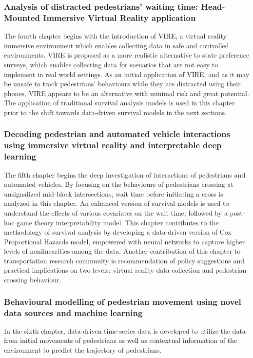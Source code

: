 \subsubsection*{Analysis of distracted pedestrians' waiting time: Head-Mounted Immersive Virtual Reality application}
The fourth chapter begins with the introduction of VIRE, a virtual reality immersive environment which enables collecting data in safe and controlled environments. VIRE is proposed as a more realistic alternative to state preference surveys, which enables collecting data for scenarios that are not easy to implement in real world settings. As an initial application of VIRE, and as it may be unsafe to track pedestrians' behaviours while they are distracted using their phones, VIRE appears to be an alternative with minimal risk and great potential. The application of traditional survival analysis models is used in this chapter prior to the shift towards data-driven survival models in the next sections. 


\subsubsection*{Decoding pedestrian and automated vehicle interactions using immersive virtual reality and interpretable deep learning}
The fifth chapter begins the deep investigation of interactions of pedestrians and automated vehicles. By focusing on the behaviours of pedestrians crossing at unsignalized mid-block intersections, wait time before initiating a cross is analyzed in this chapter. An enhanced version of survival models is used to understand the effects of various covariates on the wait time, followed by a post-hoc game theory interpretability model.
This chapter contributes to the methodology of survival analysis by developing a data-driven version of Cox Proportional Hazards model, empowered with neural networks to capture higher levels of nonlinearities among the data. Another contribution of this chapter to transportation research community is recommendation of policy suggestions and practical implications on two levels: virtual reality data collection and pedestrian crossing behaviour. 


\subsubsection*{Behavioural modelling of pedestrian movement using novel data sources and machine learning}
In the sixth chapter, data-driven time-series data is developed to utilize the data from initial movements of pedestrians as well as contextual information of the environment to predict the trajectory of pedestrians. 

